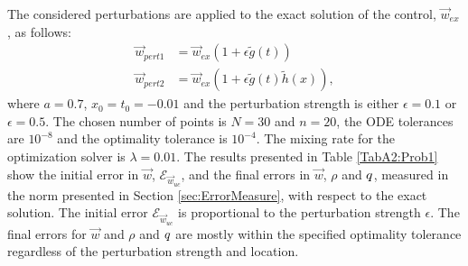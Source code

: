  The considered perturbations are applied to the exact solution of the control, $\vec{w}_{ex}$, as follows:
\begin{align*}
\vec{w}_{pert1} &= \vec{w}_{ex}(1+ \epsilon \tilde g(t))\\
\vec{w}_{pert2} &= \vec{w}_{ex}(1+ \epsilon \tilde g(t) \tilde h(x)),
\end{align*}
where $a = 0.7$, $x_0 = t_0 = -0.01$ and the perturbation strength is either $\epsilon = 0.1$ or $\epsilon = 0.5$.
The chosen number of points is $N =30$ and $n=20$, the ODE tolerances are $10^{-8}$ and the optimality tolerance is $10^{-4}$. The mixing rate for the optimization solver is $\lambda = 0.01$.
The results presented in Table \ref{TabA2:Prob1} show the initial error in $\vec{w}$, $\mathcal{E}_{\vec{w}_{uc}}$, and the final errors in $\vec{w}$, $\rho$ and $q$, measured in the norm presented in Section \ref{sec:ErrorMeasure}, with respect to the exact solution. The initial error $\mathcal{E}_{\vec{w}_{uc}}$ is proportional to the perturbation strength $\epsilon$. The final errors for $\vec{w}$ and $\rho$ and $q$ are mostly within the specified optimality tolerance regardless of the perturbation strength and location. 

